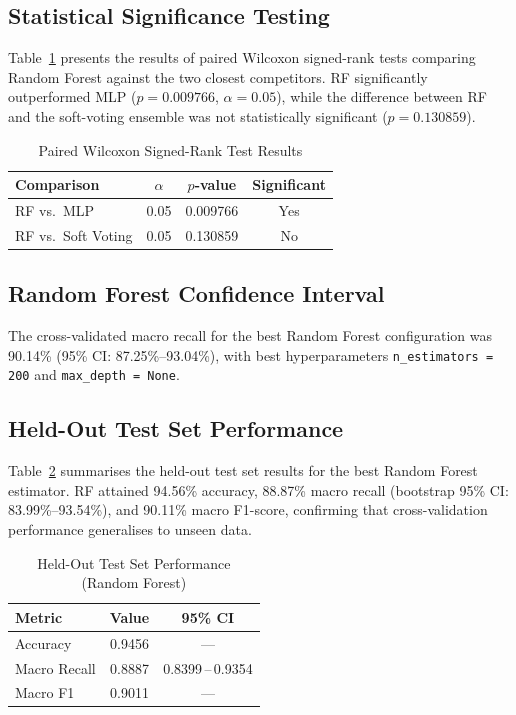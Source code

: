 \documentclass[sigconf]{acmart}
\begin{document}
\subsection{Statistical Significance Testing}
\label{subsec:significance}

Table~\ref{tab:wilcoxon} presents the results of paired Wilcoxon signed-rank tests comparing Random Forest against the two closest competitors. RF significantly outperformed MLP ($p = 0.009766$, $\alpha = 0.05$), while the difference between RF and the soft-voting ensemble was not statistically significant ($p = 0.130859$).

\begin{table}[t]
\centering
\caption{Paired Wilcoxon Signed-Rank Test Results}
\label{tab:wilcoxon}
\begin{tabular}{lccc}
\toprule
\textbf{Comparison} & \textbf{$\alpha$} & \textbf{$p$-value} & \textbf{Significant} \\
\midrule
RF vs.\ MLP          & 0.05 & 0.009766 & Yes \\
RF vs.\ Soft Voting  & 0.05 & 0.130859 & No  \\
\bottomrule
\end{tabular}
\end{table}

\subsection{Random Forest Confidence Interval}
\label{subsec:rf_ci}

The cross-validated macro recall for the best Random Forest configuration was 90.14\% (95\% CI: 87.25\%--93.04\%), with best hyperparameters \texttt{n\_estimators = 200} and \texttt{max\_depth = None}.

\subsection{Held-Out Test Set Performance}
\label{subsec:test_perf}

Table~\ref{tab:test} summarises the held-out test set results for the best Random Forest estimator. RF attained 94.56\% accuracy, 88.87\% macro recall (bootstrap 95\% CI: 83.99\%--93.54\%), and 90.11\% macro F1-score, confirming that cross-validation performance generalises to unseen data.

\begin{table}[t]
\centering
\caption{Held-Out Test Set Performance (Random Forest)}
\label{tab:test}
\begin{tabular}{lcc}
\toprule
\textbf{Metric} & \textbf{Value} & \textbf{95\% CI} \\
\midrule
Accuracy      & 0.9456 & ---                 \\
Macro Recall  & 0.8887 & 0.8399\,--\,0.9354  \\
Macro F1      & 0.9011 & ---                 \\
\bottomrule
\end{tabular}
\end{table}
\end{document}
